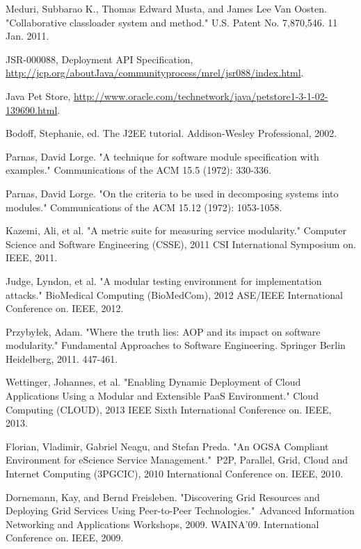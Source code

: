 \documentclass[conference]{IEEEtran}
\begin{document}
\begin{thebibliography}{9}
Meduri, Subbarao K., Thomas Edward Musta, and James Lee Van Oosten. "Collaborative classloader system and method." U.S. Patent No. 7,870,546. 11 Jan. 2011.

JSR-000088, Deployment API Specification, \url{http://jcp.org/aboutJava/communityprocess/mrel/jsr088/index.html}.

Java Pet Store, \url{http://www.oracle.com/technetwork/java/petstore1-3-1-02-139690.html}.

Bodoff, Stephanie, ed. The J2EE tutorial. Addison-Wesley Professional, 2002.



Parnas, David Lorge. "A technique for software module specification with examples." Communications of the ACM 15.5 (1972): 330-336.

Parnas, David Lorge. "On the criteria to be used in decomposing systems into modules." Communications of the ACM 15.12 (1972): 1053-1058.

Kazemi, Ali, et al. "A metric suite for measuring service modularity." Computer Science and Software Engineering (CSSE), 2011 CSI International Symposium on. IEEE, 2011.

Judge, Lyndon, et al. "A modular testing environment for implementation attacks." BioMedical Computing (BioMedCom), 2012 ASE/IEEE International Conference on. IEEE, 2012.

Przybyłek, Adam. "Where the truth lies: AOP and its impact on software modularity." Fundamental Approaches to Software Engineering. Springer Berlin Heidelberg, 2011. 447-461.

Wettinger, Johannes, et al. "Enabling Dynamic Deployment of Cloud Applications Using a Modular and Extensible PaaS Environment." Cloud Computing (CLOUD), 2013 IEEE Sixth International Conference on. IEEE, 2013.

Florian, Vladimir, Gabriel Neagu, and Stefan Preda. "An OGSA Compliant Environment for eScience Service Management." P2P, Parallel, Grid, Cloud and Internet Computing (3PGCIC), 2010 International Conference on. IEEE, 2010.

Dornemann, Kay, and Bernd Freisleben. "Discovering Grid Resources and Deploying Grid Services Using Peer-to-Peer Technologies." Advanced Information Networking and Applications Workshops, 2009. WAINA'09. International Conference on. IEEE, 2009.


\end{thebibliography}
\end{document}
